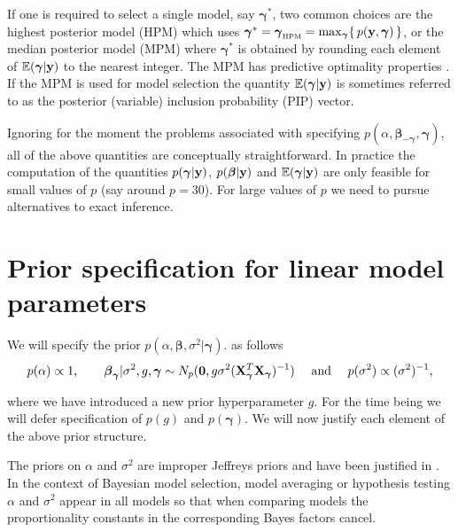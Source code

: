 \documentclass[12pt]{article}
\def\vectorfontone{\bf}
\def\vectorfonttwo{\boldsymbol}
\def\vy{{\vectorfontone y}}                      %
\def\vzero{{\vectorfontone 0}}
\def\vbeta{{\vectorfonttwo \beta}}               %
\def\vgamma{{\vectorfonttwo \gamma}}             %
\def\matrixfontone{\bf}
\def\mX{{\matrixfontone X}}                      %
\def\bE{{\mathbb E}}                             %
\def\ds{\displaystyle}
\begin{document}
If one is required to select a single model, say $\vgamma^*$, two common choices are the 
highest posterior model (HPM) which uses $\vgamma^* = \vgamma_{\mbox{\tiny HPM}} = \max_\vgamma \{ \, p(\vy,\vgamma) \, \}$, or the
median posterior model (MPM) where $\vgamma^*$ is obtained by
rounding each element of $\bE(\vgamma|\vy)$ to the nearest integer.
The MPM has predictive optimality properties \citep{barbieri2004}.
If the MPM is used for model selection
the quantity $\bE(\vgamma|\vy)$ is sometimes referred to as the
posterior (variable) inclusion probability (PIP) vector.

Ignoring for the moment the problems associated with specifying
$p(\alpha,\vbeta_{-\vgamma},\vgamma)$, all of the above quantities are conceptually
straightforward. In practice the computation of the quantities $p(\vgamma|\vy)$, $p(\vbeta|\vy)$ and 
$\bE(\vgamma|\vy)$ are only feasible for small values of $p$ (say around $p=30$). For large values of $p$ we need to pursue
alternatives to exact inference.

 
 
\section{Prior specification for linear model parameters}
\label{sec:model}

We will specify the prior $p(\alpha,\vbeta,\sigma^2|\vgamma)$.
as follows
\begin{equation}
\label{eq:priorStructure}
\begin{array}{c}
\ds p(\alpha) \propto 1,  
\qquad 
\vbeta_\vgamma | \sigma^2, g, \vgamma \sim N_p(\vzero, g \sigma^2 (\mX_\vgamma^T \mX_\vgamma)^{-1})
\quad \text{ and }  \quad 
\ds p(\sigma^2) \propto (\sigma^2)^{-1},                      
\end{array}
\end{equation} 

\noindent where we have introduced a new prior hyperparameter $g$.
For the time being we will defer specification of $p(g)$ and $p(\vgamma)$.
We will now justify each element of the above prior structure.

The priors on $\alpha$ and $\sigma^2$ are improper Jeffreys priors and have been justified 
in \cite{Berger1998}. In the context of Bayesian model selection, model averaging or hypothesis 
testing $\alpha$ and $\sigma^2$ appear in all models 
so that when comparing models the proportionality constants in the corresponding
Bayes factors cancel.
\end{document}
